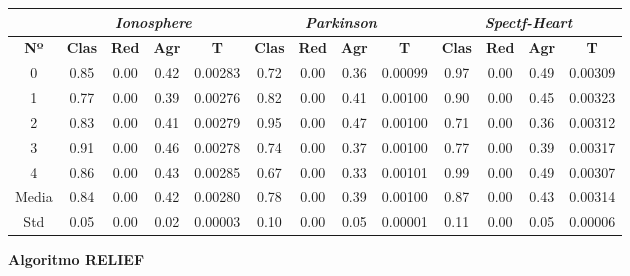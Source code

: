 \documentclass[10pt, a4paper]{article}
\theoremstyle{theorem-style}
\theoremstyle{theorem-style}
\theoremstyle{theorem2-style}
\theoremstyle{definition-style}
\theoremstyle{remark-style}
\theoremstyle{example-style}
\theoremstyle{definition-style}
\theoremstyle{remark-style}
\theoremstyle{remark-style}
\begin{document}
\begin{table}[ht!]
\begin{tabular}{ccccc|cccc|cccc}
\centering
 & \multicolumn{4}{c}{\textit{Ionosphere}} & \multicolumn{4}{c}{\textit{Parkinson}} & \multicolumn{4}{c}{\textit{Spectf-Heart}} \\ \hline
\textbf{Nº} & \textbf{Clas} & \textbf{Red} & \textbf{Agr} & \textbf{T} & \textbf{Clas} & \textbf{Red} & \textbf{Agr} & \textbf{T} & \textbf{Clas} & \textbf{Red} & \textbf{Agr} & \textbf{T} \\ \hline
0&	 0.85 & 0.00 & 0.42 & 0.00283 & 	0.72 & 0.00 & 0.36 & 0.00099 & 		0.97 & 0.00 & 0.49 & 0.00309 \\ 
1&	 0.77 & 0.00 & 0.39 & 0.00276 & 	0.82 & 0.00 & 0.41 & 0.00100 & 		0.90 & 0.00 & 0.45 & 0.00323 \\ 
2&	 0.83 & 0.00 & 0.41 & 0.00279 & 	0.95 & 0.00 & 0.47 & 0.00100 & 		0.71 & 0.00 & 0.36 & 0.00312 \\ 
3&	 0.91 & 0.00 & 0.46 & 0.00278 & 	0.74 & 0.00 & 0.37 & 0.00100 & 		0.77 & 0.00 & 0.39 & 0.00317 \\ 
4&	 0.86 & 0.00 & 0.43 & 0.00285 & 	0.67 & 0.00 & 0.33 & 0.00101 & 		0.99 & 0.00 & 0.49 & 0.00307 \\ 
\hline
Media&	 0.84 & 0.00 & 0.42 & 0.00280	& 0.78 & 0.00 & 0.39 & 0.00100	& 0.87 & 0.00 & 0.43 & 0.00314
 \\ Std&	 0.05 & 0.00 & 0.02 & 0.00003	& 0.10 & 0.00 & 0.05 & 0.00001	&	0.11 & 0.00 & 0.05 & 0.00006
 \\ 
\end{tabular}
\end{table}


\textbf{Algoritmo RELIEF}
\end{document}
